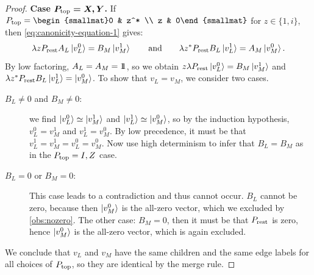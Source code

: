 \begin{proof}
        \textbf{Case $\boldsymbol{P_{\textnormal{top}} = X, Y}$.}
    If $\Ptop = \begin{smallmat}0 & z^* \\ z & 0\end{smallmat}$ for $z \in \{1, i\}$, then
    \autoref{eq:canonicity-equation-1} gives:
        \[
            \lambda zP_{\textnormal{rest}} A_L \ket{v_L^0} = B_M \ket{v_M^1}
            \qquad\textnormal{and}\qquad
            \lambda z^*P_{\textnormal{rest}} B_L \ket{v_L^1} = A_M \ket{v_M^0}
            .
        \]
        By low factoring, $A_L = A_M = 1\!\!1$, so we obtain 
        $z\lambda  P_{\textnormal{rest}} \ket{v_L^0} = B_M \ket{v_M^1}$
        and
        $\lambda z^*P_{\textnormal{rest}} B_L \ket{v_L^1} = \ket{v_M^0}$.
To show that $v_L = v_M$, we consider two cases.       
\begin{description}
        \item[$B_L \neq 0$ and $B_M \neq 0$:] we find $\ket{v_L^0} \simeq \ket{v_M^1}$ and $\ket{v_L^1} \simeq \ket{v_M^0}$, so by the induction hypothesis, $v_L^0= v_M^1$ and $v_L^1= v_M^0$.
        By low precedence, it must be that $v_L^1 = v_M^1 = v_L^0 = v_M^0$.
        Now use high determinism to infer that $B_L = B_M$ as in the ${P_{\textnormal{top}} = I,Z}$ case.

        \item[$B_L = 0$ or $B_M = 0$:]
       This case leads to a contradiction and thus cannot occur.
        $B_L$ cannot be zero, because then $\ket{v_M^0}$ is the all-zero vector, which we excluded by \ref{obs:nozero}.
        The other case: $B_M = 0$, then it must be that $P_{\textnormal{rest}}$ is zero, hence $\ket{v_M^0}$ is the all-zero vector, which is again excluded.
\end{description}
 We conclude that $v_L$ and $v_M$ have the same children and the same edge labels  for all choices of $P_{\textnormal{top}}$, so they are identical by the merge rule.
\end{proof}



